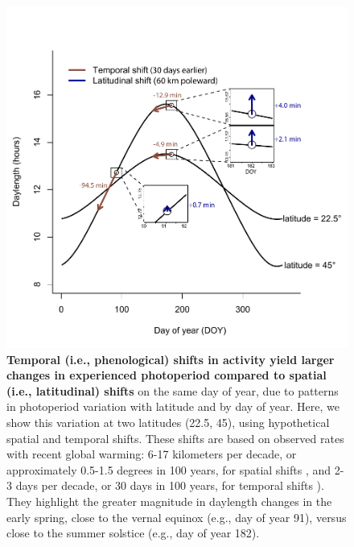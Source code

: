 \documentclass{article}
\begin{document}
\begin{figure}[p]
\centering
\includegraphics{..//..//analyses/photoperiod/figures/photo_spacetime_v2a.pdf} %
\caption{\textbf{Temporal (i.e., phenological) shifts in activity yield larger changes in experienced photoperiod compared to spatial (i.e., latitudinal) shifts} on the same day of year, due to patterns in photoperiod variation with latitude and by day of year. Here, we show this variation at two latitudes (22.5\degree, 45\degree), using hypothetical spatial and temporal shifts. These shifts are based on observed rates with recent global warming: 6-17 kilometers per decade, or approximately 0.5-1.5 degrees in 100 years, for spatial shifts \citep{parmesan2003,parmesan2006}, and 2-3 days per decade, or 30 days in 100 years, for temporal shifts \citep{parmesan2006,chen2011}). They highlight the greater magnitude in daylength changes in the early spring, close to the vernal equinox (e.g., day of year 91), versus close to the summer solstice (e.g., day of year 182).}
 \label{fig:spacetime}%
 \end{figure}
 
\end{document}
